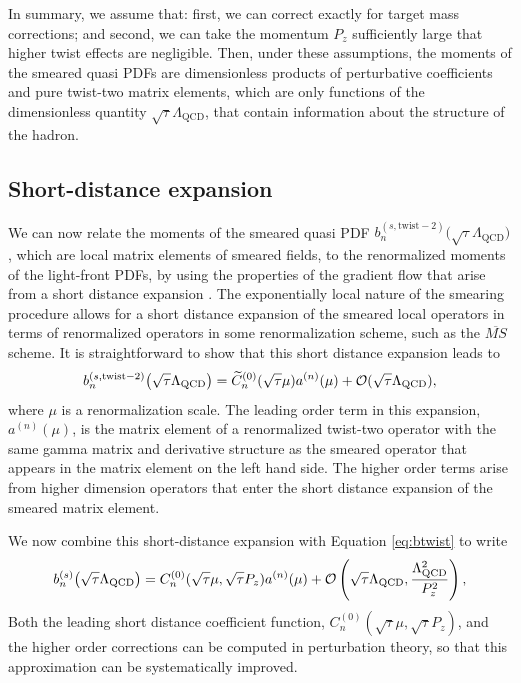 In summary, we assume that: first, we can correct exactly for target mass 
corrections; and second, we can take the momentum $P_z$ sufficiently large that 
higher 
twist effects are negligible. Then, under these 
assumptions, the moments of the smeared quasi PDFs are dimensionless products 
of perturbative coefficients and pure twist-two matrix elements, which are only 
functions of the 
dimensionless quantity
$\sqrt{\tau} \Lambda_{\mathrm{QCD}}$, that contain
information about the structure of the hadron.

\subsection{\label{sec:renormpdf} Short-distance expansion}

We can now relate the moments of the smeared quasi PDF 
$b_n^{(s,\mathrm{twist}-2)}\big(\sqrt{\tau}\Lambda_{\mathrm{QCD}}\big)$, which 
are local matrix elements of smeared fields, to the renormalized moments of the 
light-front PDFs, by using the properties of the gradient flow that arise from 
a short distance expansion 
\cite{Luscher:2011bx,Suzuki:2013gza,Asakawa:2013laa,Makino:2014taa,
Hieda:2016lly}. 
The exponentially local nature of the smearing procedure 
allows for a short distance expansion of the smeared local operators in terms 
of renormalized operators in some renormalization scheme, such as the 
$\overline{MS}$ scheme. It is straightforward to show that this short 
distance expansion leads to 
\begin{equation}\label{eq:shortdist}
b_n^{(s,\mathrm{twist}-2)}\big(\sqrt{\tau}\Lambda_{\mathrm{QCD}}\big) = 
\widetilde{C}_n^{(0)}(\sqrt{\tau}\mu)a^{(n)}(\mu) + {\cal 
O}(\sqrt{\tau}\Lambda_{\mathrm{QCD}}),
\end{equation}
where $\mu$ is a renormalization scale. The leading order term in this 
expansion, $a^{(n)}(\mu)$, is the matrix element of a renormalized twist-two 
operator with the same gamma matrix and derivative structure as the smeared 
operator that appears in the matrix element on the left hand side. The higher 
order terms arise from higher dimension operators that enter the short distance 
expansion of the smeared matrix element.

We now combine this short-distance expansion with Equation \eqref{eq:btwist} to 
write
\begin{equation}\label{eq:double}
b_n^{(s)}\big(\sqrt{\tau}\Lambda_{\mathrm{QCD}}\big) = 
C_n^{(0)}(\sqrt{\tau}\mu, \sqrt{\tau}P_z)a^{(n)}(\mu) + {\cal 
O}\left(\sqrt{\tau}\Lambda_{\mathrm{QCD}},\frac{\Lambda_\mathrm{QCD}^2}{P_z^2} 
\right),
\end{equation}
Both the leading short distance coefficient function,
$ C_n^{(0)}(\sqrt{\tau}\mu, \sqrt{\tau}P_z)$, and the higher order corrections 
can be 
computed in perturbation theory, so that this approximation can be 
systematically improved. 

